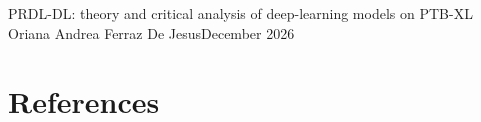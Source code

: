 \documentclass[11pt]{article}
\begin{document}
%
            {PRDL-DL: theory and critical analysis of deep-learning models on PTB-XL}%
            {Oriana Andrea Ferraz De Jesus}{December 2026}

\tableofcontents
\newpage


\newpage









\clearpage
\section{References}
\begingroup
\renewcommand{\section}[2]{}


\endgroup

\newpage

\newpage

\end{document}
